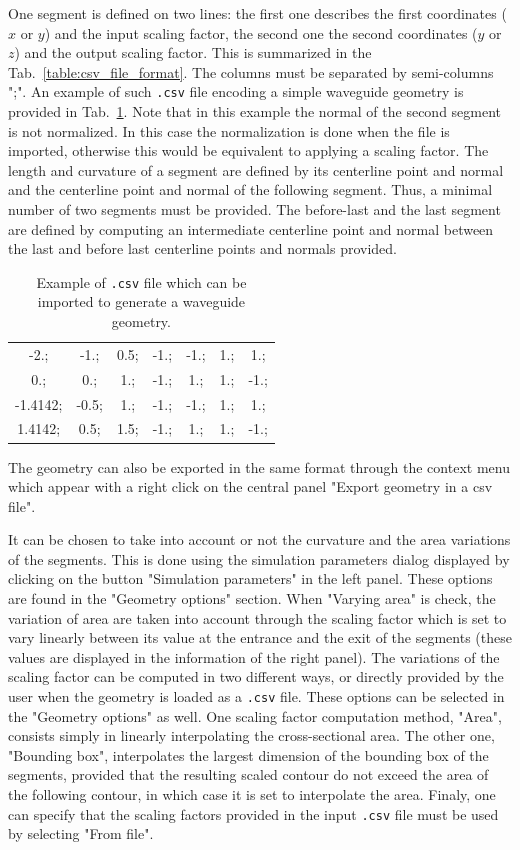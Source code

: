 \documentclass[]{article}
\begin{document}
	One segment is defined on two lines: the first one describes the 
	first coordinates ($x$ or $y$) and the input scaling factor, the second one the second coordinates ($y$ or $z$) and the output scaling factor. 
	This is summarized in the Tab.~\ref{table:csv_file_format}.
	The columns must be separated by semi-columns ";". 
	An example of such \texttt{.csv} file encoding a simple waveguide
	geometry is provided in Tab.~\ref{table:example_csv_file}.
	Note that in this example the normal of the second segment is not normalized.
	In this case the normalization is done when the file is imported, otherwise
	this would be equivalent to applying a scaling factor.
	The length and curvature of a segment are defined by its centerline
	point and normal and the centerline point and normal of the 
	following segment.
	Thus, a minimal number of two segments must be provided. 
	The before-last and the last segment are defined by computing an 
	intermediate centerline point and normal between the last and 
	before last centerline points and normals provided.
	
	\begin{table}[h!]
		\centering
		\begin{tabular}{c c c c c c c }
			-2.;& -1.;& 0.5;& -1.;& -1.;& 1.;& 1.; \\
			0.;& 0.;& 1.;& -1.;& 1.;& 1.;& -1.; \\
			-1.4142;& -0.5;& 1.;& -1.;& -1.;& 1.;& 1.; \\
			1.4142;& 0.5;& 1.5;& -1.;& 1.;& 1.;& -1.; 
		\end{tabular}
		\caption{Example of \texttt{.csv} file which can be imported to generate a waveguide geometry.}
		\label{table:example_csv_file}
	\end{table}

	The geometry can also be exported in the same format through 
	the context menu which appear with a right click on the central panel
	"Export geometry in a csv file". 
	
	It can be chosen to take into account or not the curvature and 
	the area variations of the segments. This is done using the 
	simulation parameters dialog displayed by clicking on the 
	button "Simulation parameters" in the left panel. 
	These options are found in the "Geometry options" section.
	When "Varying area" is check, the variation of area are taken into 
	account through the scaling factor which is set to vary linearly
	between its value at the entrance and the exit of the segments (these values are displayed in the information of the right panel).
	The variations of the scaling factor can be computed in two different
	ways, or directly provided by the user when the geometry is loaded 
	as a \texttt{.csv} file. These options can be selected in the 
	"Geometry options" as well. One scaling factor computation method, 
	"Area", 
	consists simply in linearly interpolating the cross-sectional area.
	The other one, "Bounding box", interpolates the largest dimension of the bounding 
	box of the segments, provided that the resulting scaled contour 
	do not exceed the area of the following contour, in which case it 
	is set to interpolate the area. 
	Finaly, one can specify that the scaling factors provided in the 
	input \texttt{.csv} file must be used by selecting "From file".
	
\end{document}
